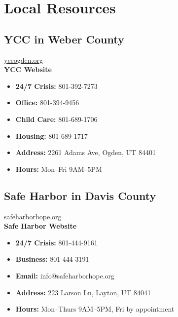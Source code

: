 \documentclass[12pt]{article}
\begin{document}
\section*{Local Resources}
\begin{multicols}{2}
\begin{tcolorbox}[fixedhalfbox]
\subsection*{YCC in Weber County}
\begin{center}
    \href{https://www.yccogden.org}{yccogden.org}\\
    \textbf{YCC Website}\\[.5em]
\end{center}

\vspace{0.5em}
{\small
\begin{itemize}[leftmargin=0.5em]
    \item \textbf{24/7 Crisis:} 801-392-7273
    \item \textbf{Office:} 801-394-9456
    \item \textbf{Child Care:} 801-689-1706
    \item \textbf{Housing:} 801-689-1717
    \item \textbf{Address:} 2261 Adams Ave, Ogden, UT 84401
    \item \textbf{Hours:} Mon–Fri 9AM–5PM
\end{itemize}
}
\end{tcolorbox}

\columnbreak

\begin{tcolorbox}[fixedhalfbox]
\subsection*{Safe Harbor in Davis County}
\begin{center}
    \href{https://safeharborhope.org}{safeharborhope.org}\\
    \textbf{Safe Harbor Website}\\[.5em]
\end{center}

\vspace{0.5em}
{\small
\begin{itemize}[leftmargin=0.5em]
    \item \textbf{24/7 Crisis:} 801-444-9161
    \item \textbf{Business:} 801-444-3191
    \item \textbf{Email:} info@safeharborhope.org
    \item \textbf{Address:} 223 Larson Ln, Layton, UT 84041
    \item \textbf{Hours:} Mon–Thurs 9AM–5PM, Fri by appointment
\end{itemize}
}
\end{tcolorbox}
\end{multicols}
\end{document}
